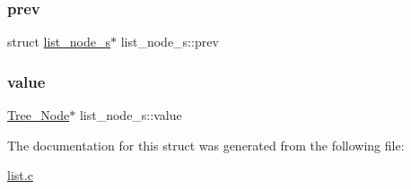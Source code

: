 \subsubsection{\texorpdfstring{prev}{prev}}
{\footnotesize\ttfamily struct \mbox{\hyperlink{structlist__node__s}{list\+\_\+node\+\_\+s}}$\ast$ list\+\_\+node\+\_\+s\+::prev}

\mbox{\label{structlist__node__s_aaa2c948828e4b204d91773042ef2797c}} 
\subsubsection{\texorpdfstring{value}{value}}
{\footnotesize\ttfamily \mbox{\hyperlink{list_8h_a68f0ccc88265f29ccc7b9c8133456b67}{Tree\+\_\+\+Node}}$\ast$ list\+\_\+node\+\_\+s\+::value}



The documentation for this struct was generated from the following file\+:\begin{DoxyCompactItemize}
\item 
\mbox{\hyperlink{list_8c}{list.\+c}}\end{DoxyCompactItemize}
